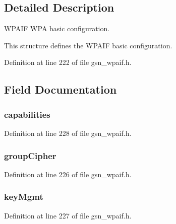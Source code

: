 \subsection{Detailed Description}
WPAIF WPA basic configuration. 

This structure defines the WPAIF basic configuration. 

Definition at line 222 of file gsn\_\-wpaif.h.



\subsection{Field Documentation}
\hypertarget{a00420_a0a6ef5c242a65361e9f85781f02fb006}{
\subsubsection[{capabilities}]{ {\bf capabilities}}}
\label{a00420_a0a6ef5c242a65361e9f85781f02fb006}


Definition at line 228 of file gsn\_\-wpaif.h.

\hypertarget{a00420_a5ec68df5277949030e6a5438cd4227a8}{
\subsubsection[{groupCipher}]{ {\bf groupCipher}}}
\label{a00420_a5ec68df5277949030e6a5438cd4227a8}


Definition at line 226 of file gsn\_\-wpaif.h.

\hypertarget{a00420_ad4fe2089d827eafc0079062d4c169273}{
\subsubsection[{keyMgmt}]{ {\bf keyMgmt}}}
\label{a00420_ad4fe2089d827eafc0079062d4c169273}


Definition at line 227 of file gsn\_\-wpaif.h.

